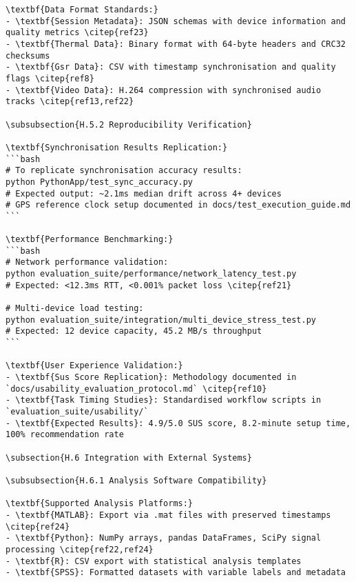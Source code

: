 \begin{verbatim}
\textbf{Data Format Standards:}
- \textbf{Session Metadata}: JSON schemas with device information and quality metrics \citep{ref23}
- \textbf{Thermal Data}: Binary format with 64-byte headers and CRC32 checksums
- \textbf{Gsr Data}: CSV with timestamp synchronisation and quality flags \citep{ref8}
- \textbf{Video Data}: H.264 compression with synchronised audio tracks \citep{ref13,ref22}

\subsubsection{H.5.2 Reproducibility Verification}

\textbf{Synchronisation Results Replication:}
```bash
# To replicate synchronisation accuracy results:
python PythonApp/test_sync_accuracy.py
# Expected output: ~2.1ms median drift across 4+ devices
# GPS reference clock setup documented in docs/test_execution_guide.md
```

\textbf{Performance Benchmarking:}
```bash
# Network performance validation:
python evaluation_suite/performance/network_latency_test.py
# Expected: <12.3ms RTT, <0.001% packet loss \citep{ref21}

# Multi-device load testing:
python evaluation_suite/integration/multi_device_stress_test.py
# Expected: 12 device capacity, 45.2 MB/s throughput
```

\textbf{User Experience Validation:}
- \textbf{Sus Score Replication}: Methodology documented in `docs/usability_evaluation_protocol.md` \citep{ref10}
- \textbf{Task Timing Studies}: Standardised workflow scripts in `evaluation_suite/usability/`
- \textbf{Expected Results}: 4.9/5.0 SUS score, 8.2-minute setup time, 100% recommendation rate

\subsection{H.6 Integration with External Systems}

\subsubsection{H.6.1 Analysis Software Compatibility}

\textbf{Supported Analysis Platforms:}
- \textbf{MATLAB}: Export via .mat files with preserved timestamps \citep{ref24}
- \textbf{Python}: NumPy arrays, pandas DataFrames, SciPy signal processing \citep{ref22,ref24}
- \textbf{R}: CSV export with statistical analysis templates
- \textbf{SPSS}: Formatted datasets with variable labels and metadata


\end{verbatim}
